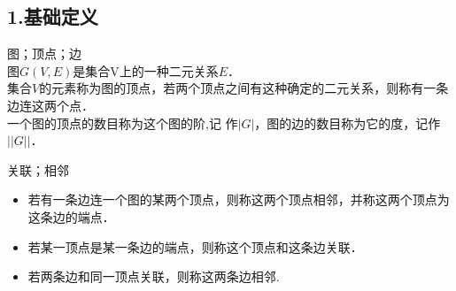 \begin{issues}
\issueTODO
\end{issues}
\subsection{1.基础定义}
\begin{definition}{图；顶点；边}
\\图$G(V,E)$是集合V上的一种二元关系$E$．
\\集合$V$的元素称为图的顶点，若两个顶点之间有这种确定的二元关系，则称有一条边连这两个点．
\\一个图的顶点的数目称为这个图的阶,记 作$|G|$，图的边的数目称为它的度，记作$||G||$．
\end{definition}
\begin{definition}{关联；相邻}
\begin{itemize}
\item 若有一条边连一个图的某两个顶点，则称这两个顶点相邻，并称这两个顶点为这条边的端点．
\item 若某一顶点是某一条边的端点，则称这个顶点和这条边关联．
\item 若两条边和同一顶点关联，则称这两条边相邻.
\end{itemize}
\end{definition}
